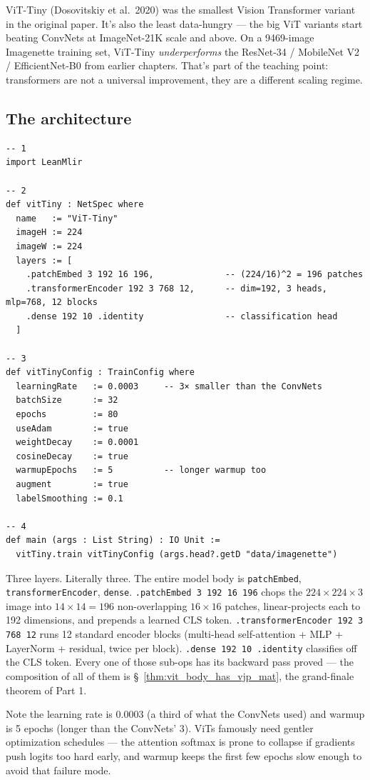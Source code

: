 ViT-Tiny (Dosovitskiy et al.\ 2020) was the smallest Vision
Transformer variant in the original paper. It's also the least
data-hungry --- the big ViT variants start beating ConvNets at
ImageNet-21K scale and above. On a 9469-image Imagenette training
set, ViT-Tiny \emph{underperforms} the ResNet-34 / MobileNet V2 /
EfficientNet-B0 from earlier chapters. That's part of the teaching
point: transformers are not a universal improvement, they are a
different scaling regime.

\subsection*{The architecture}

\begin{verbatim}
-- 1
import LeanMlir

-- 2
def vitTiny : NetSpec where
  name   := "ViT-Tiny"
  imageH := 224
  imageW := 224
  layers := [
    .patchEmbed 3 192 16 196,              -- (224/16)^2 = 196 patches
    .transformerEncoder 192 3 768 12,      -- dim=192, 3 heads, mlp=768, 12 blocks
    .dense 192 10 .identity                -- classification head
  ]

-- 3
def vitTinyConfig : TrainConfig where
  learningRate   := 0.0003     -- 3× smaller than the ConvNets
  batchSize      := 32
  epochs         := 80
  useAdam        := true
  weightDecay    := 0.0001
  cosineDecay    := true
  warmupEpochs   := 5          -- longer warmup too
  augment        := true
  labelSmoothing := 0.1

-- 4
def main (args : List String) : IO Unit :=
  vitTiny.train vitTinyConfig (args.head?.getD "data/imagenette")
\end{verbatim}

Three layers. Literally three. The entire model body is
\texttt{patchEmbed}, \texttt{transformerEncoder}, \texttt{dense}.
\texttt{.patchEmbed 3 192 16 196} chops the $224 \times 224 \times 3$
image into $14 \times 14 = 196$ non-overlapping $16 \times 16$
patches, linear-projects each to 192 dimensions, and prepends a
learned $\mathrm{CLS}$ token. \texttt{.transformerEncoder 192 3 768
12} runs 12 standard encoder blocks (multi-head self-attention + MLP
+ LayerNorm + residual, twice per block). \texttt{.dense 192 10
.identity} classifies off the CLS token. Every one of those sub-ops
has its backward pass proved --- the composition of all of them is
\S~\ref{thm:vit_body_has_vjp_mat}, the grand-finale theorem of Part
1.

Note the learning rate is 0.0003 (a third of what the ConvNets
used) and warmup is 5 epochs (longer than the ConvNets' 3). ViTs
famously need gentler optimization schedules --- the attention
softmax is prone to collapse if gradients push logits too hard
early, and warmup keeps the first few epochs slow enough to avoid
that failure mode.


